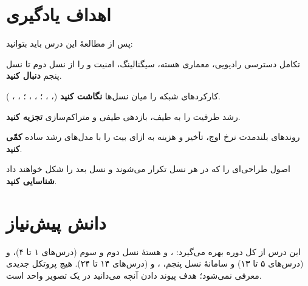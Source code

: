 \documentclass[11pt,a4paper]{article}
\begin{document}
\ACNcover

\section{اهداف یادگیری}
پس از مطالعهٔ این درس باید بتوانید:
\begin{objectives}
  \item تکامل دسترسی رادیویی، معماری هسته، سیگنالینگ، امنیت و  را از نسل دوم تا نسل پنجم \textbf{دنبال کنید}.
  \item کارکردهای شبکه را میان نسل‌ها \textbf{نگاشت کنید} (، ، ؛ ، ، ؛ ، ، ).
  \item رشد ظرفیت را به طیف، بازدهی طیفی و متراکم‌سازی \textbf{تجزیه کنید}.
  \item روندهای بلندمدت نرخ اوج، تأخیر و هزینه به ازای بیت را با مدل‌های رشد ساده \textbf{کمّی کنید}.
  \item اصول طراحی‌ای را که در هر نسل تکرار می‌شوند و نسل بعد را شکل خواهند داد \textbf{شناسایی کنید}.
\end{objectives}

\section{دانش پیش‌نیاز}
این درس از کل دوره بهره می‌گیرد: ،  و هستهٔ نسل دوم و سوم (درس‌های ۱ تا ۴)،  و  (درس‌های ۵ تا ۱۳) و سامانهٔ
نسل پنجم، ،  و  (درس‌های ۱۴ تا ۲۴). هیچ پروتکل جدیدی معرفی نمی‌شود؛ هدف پیوند دادن آنچه می‌دانید در یک تصویر واحد است.
\end{document}
